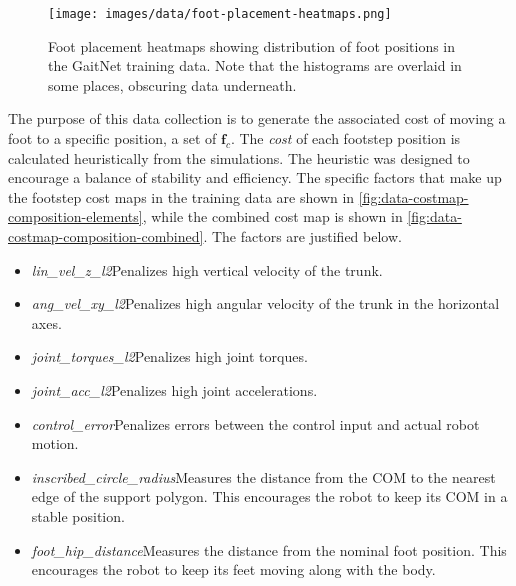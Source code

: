 \begin{figure}[H]
  \centering
  \texttt{[image: images/data/foot-placement-heatmaps.png]}
  \caption{Foot placement heatmaps showing distribution of foot
    positions in the GaitNet training data. Note that the histograms
  are overlaid in some places, obscuring data underneath.}
  \label{fig:data-cn-training-distribution}
\end{figure}

The purpose of this data collection is to generate the associated cost of
moving a foot to a specific position, a set of $\mathbf f_c$. The \textit{cost}
of each footstep position is calculated heuristically from the simulations.
The heuristic was designed to encourage a balance of stability and efficiency.
The specific factors that make up the footstep cost maps in the training data
are shown in \autoref{fig:data-costmap-composition-elements}, while the
combined cost map is shown in \autoref{fig:data-costmap-composition-combined}.
The factors are justified below.

\begin{itemize}
  \item \textit{lin\_vel\_z\_l2}\textemdash Penalizes high vertical
    velocity of the trunk.
  \item \textit{ang\_vel\_xy\_l2}\textemdash Penalizes high angular
    velocity of the trunk in
    the horizontal axes.
  \item \textit{joint\_torques\_l2}\textemdash Penalizes high joint torques.
  \item \textit{joint\_acc\_l2}\textemdash Penalizes high joint accelerations.
  \item \textit{control\_error}\textemdash Penalizes errors between the control
    input and actual robot motion.
  \item \textit{inscribed\_circle\_radius}\textemdash Measures the distance
    from the COM to the nearest edge of the support polygon. This
    encourages the robot to keep its COM in a stable position.
  \item \textit{foot\_hip\_distance}\textemdash Measures the distance from
    the nominal foot position. This encourages the robot to keep its feet
    moving along with the body.
\end{itemize}

